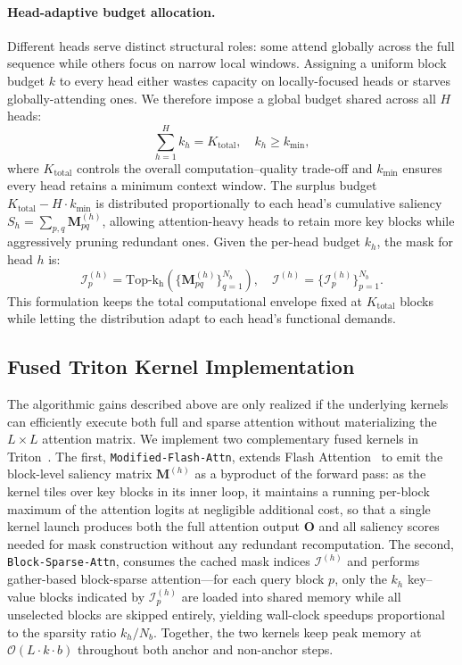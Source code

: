 \paragraph{Head-adaptive budget allocation.}
Different heads serve distinct structural roles: some attend globally across the full sequence while others focus on narrow local windows. Assigning a uniform block budget $k$ to every head either wastes capacity on locally-focused heads or starves globally-attending ones. We therefore impose a global budget shared across all $H$ heads:
\begin{equation}
    \sum_{h=1}^{H} k_h = K_{\text{total}}, \quad k_h \geq k_{\min},
    \label{eq:budget}
\end{equation}
where $K_{\text{total}}$ controls the overall computation--quality trade-off and $k_{\min}$ ensures every head retains a minimum context window. The surplus budget $K_{\text{total}} - H \cdot k_{\min}$ is distributed proportionally to each head's cumulative saliency $S_h = \sum_{p,q} \mathbf{M}^{(h)}_{pq}$, allowing attention-heavy heads to retain more key blocks while aggressively pruning redundant ones. Given the per-head budget $k_h$, the mask for head $h$ is:
\begin{equation}
    \mathcal{I}^{(h)}_p = \mathrm{Top\text{-}k_h}\!\left(\{\mathbf{M}^{(h)}_{pq}\}_{q=1}^{N_b}\right), \quad \mathcal{I}^{(h)} = \{\mathcal{I}^{(h)}_p\}_{p=1}^{N_b}.
\end{equation}
This formulation keeps the total computational envelope fixed at $K_{\text{total}}$ blocks while letting the distribution adapt to each head's functional demands.

\subsection{Fused Triton Kernel Implementation}
\label{sec:kernels}

The algorithmic gains described above are only realized if the underlying kernels can efficiently execute both full and sparse attention without materializing the $L \times L$ attention matrix. We implement two complementary fused kernels in Triton~\citep{tillet2019triton}. The first, \texttt{Modified-Flash-Attn}, extends Flash Attention~\citep{dao2022flashattention} to emit the block-level saliency matrix $\mathbf{M}^{(h)}$ as a byproduct of the forward pass: as the kernel tiles over key blocks in its inner loop, it maintains a running per-block maximum of the attention logits at negligible additional cost, so that a single kernel launch produces both the full attention output $\mathbf{O}$ and all saliency scores needed for mask construction without any redundant recomputation. The second, \texttt{Block-Sparse-Attn}, consumes the cached mask indices $\mathcal{I}^{(h)}$ and performs gather-based block-sparse attention---for each query block $p$, only the $k_h$ key--value blocks indicated by $\mathcal{I}^{(h)}_p$ are loaded into shared memory while all unselected blocks are skipped entirely, yielding wall-clock speedups proportional to the sparsity ratio $k_h / N_b$. Together, the two kernels keep peak memory at $\mathcal{O}(L \cdot k \cdot b)$ throughout both anchor and non-anchor steps.